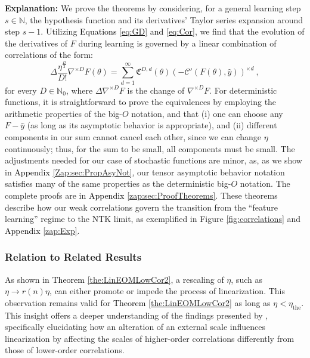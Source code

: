 \documentclass{article} %
\begin{document}
\textbf{Explanation:}
We prove the theorems by considering, for a general learning step \(s\in\mathbb{N}\), the hypothesis function and its derivatives' Taylor series expansion around step \(s-1\). Utilizing \textcolor{black}{Equations} \ref{eq:GD} \textcolor{black}{and} \ref{eq:Cor}, we find that the evolution of the derivatives of \(F\) during learning is governed by a linear combination of correlations of the form:
\begin{equation}
\Delta\frac{\eta^{\frac{D}{2}}}{D!}\nabla^{\times D}F\left(\theta\right)=\sum_{d=1}^{\infty}\mathfrak{C}^{D,d}\left(\theta\right)\left(-\mathcal{C}'\left(F\left(\theta\right),\hat{y}\right)\right)^{\times d} \ ,
\label{eq:EOMCorrelationDerivatives}
\end{equation}
for every $D\in\mathbb{N}_0$, where $\Delta \nabla^{\times D}F$ is the change of $\nabla^{\times D}F$.
For deterministic functions, it is straightforward to prove the equivalences by employing the arithmetic properties of the big-\(O\) notation, and that (i) one can choose any \(F-\hat{y}\) (as long as its asymptotic behavior is appropriate), and (ii) different components in our sum cannot cancel each other, since we can change \(\eta\) continuously; thus, for the sum to be small, all components must be small. The adjustments needed for our case of stochastic functions are minor, as, as we show in \textcolor{black}{Appendix} \ref{Zap:sec:PropAsyNot}, our tensor asymptotic behavior notation satisfies many of the same properties as the deterministic big-\(O\) notation. 
The complete proofs are in \textcolor{black}{Appendix} \ref{zap:sec:ProofTheorems}. These theorems describe how our weak correlations govern the transition from the ``feature learning'' regime to the NTK limit, as exemplified in Figure \ref{fig:correlations} and \textcolor{black}{Appendix} \ref{zap:Exp}.


\subsubsection{Relation to Related Results}
\label{sec:ExtScale}

As shown in \textcolor{black}{Theorem} \ref{the:LinEOMLowCor2}, a rescaling of \(\eta\), such as \(\eta \rightarrow r(n)\eta\), can either promote or impede the process of linearization. This observation remains valid for \textcolor{black}{Theorem} \ref{the:LinEOMLowCor2} as long as \(\eta < \eta_{\text{the}}\). This insight offers a deeper understanding of the findings presented by \cite{OnLazyTraining2019}, specifically elucidating how an alteration of an external scale influences linearization by affecting the scales of higher-order correlations differently from those of lower-order correlations.
\end{document}
